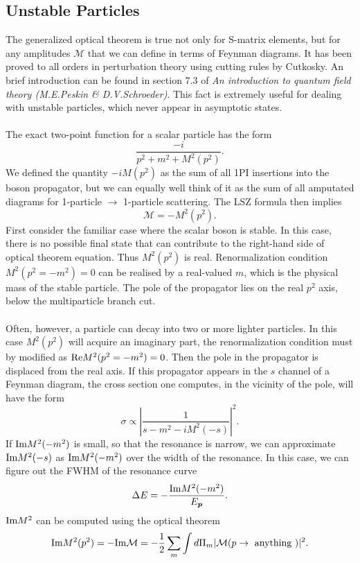 \subsection{Unstable Particles}
The generalized optical theorem is true not only for S-matrix elements, but for any amplitudes $\mathcal{M}$ that we can define in terms of Feynman diagrams. It has been proved to all orders in perturbation theory using cutting rules by Cutkosky. An brief introduction can be found in section 7.3 of \emph{An introduction to quantum field theory (M.E.Peskin \& D.V.Schroeder)}.
This fact is extremely useful for dealing with unstable particles, which never appear in asymptotic states.
\\ \\
The exact two-point function for a scalar particle has the form
\[ \frac{-i}{p^2+m^2+M^2(p^2)}.\]
We defined the quantity $-iM(p^2)$ as the sum of all 1PI insertions into the boson propagator, but we can equally well think of it as the sum of all amputated diagrams for 1-particle $\to$ 1-particle scattering. 
The LSZ formula then implies
\[ \mathcal{M} = -M^2(p^2).\]
First consider the familiar case where the scalar boson is stable. 
In this case, there is no possible final state that can contribute to the right-hand side of optical theorem equation.
Thus $M^2(p^2)$ is real. Renormalization condition $M^2(p^2 = -m^2) = 0$ can be realised by a real-valued $m$, which is the physical mass of the stable particle. The pole of the propagator lies on the real $p^2$ axis, below the multiparticle branch cut.
\\ \\
Often, however, a particle can decay into two or more lighter particles. In this case $M^2(p^2)$ will acquire an imaginary part, the renormalization condition must by modified as ${\rm Re} M^2(p^2 = -m^2) = 0$. Then the pole in the propagator is displaced from the real axis.
If this propagator appears in the $s$ channel of a Feynman diagram, the cross section one computes, in the vicinity of the pole, will have the form
\[ \sigma \propto \left| \frac{1}{s-m^2 - iM^2(-s)} \right|^2. \]
If ${\rm Im}M^2(-m^2)$ is small, so that the resonance is narrow, we can approximate ${\rm Im}M^2(-s)$ as ${\rm Im}M^2(-m^2)$ over the width of the resonance. 
In this case, we can figure out the FWHM of the resonance curve
\[ \Delta E = -\frac{{\rm Im}M^2(-m^2)}{E_{\bm{p}}}.\]
${\rm Im} M^2$ can be computed using the optical theorem
\[{\rm Im}M^2(p^2) = -{\rm Im} \mathcal{M} = -\frac{1}{2} \sum_m \int d\Pi_{m} |\mathcal{M}(p \to \mbox{ anything })|^2. \]
